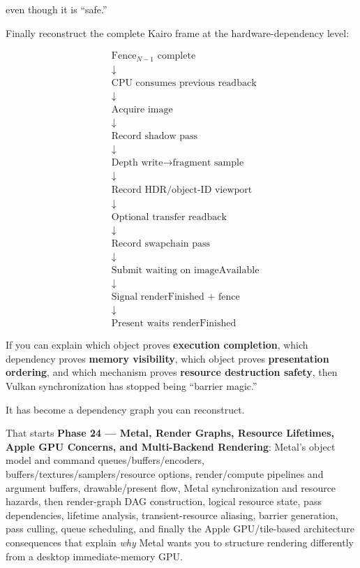 even though it is ``safe.''

Finally reconstruct the complete Kairo frame at the hardware-dependency level:

\[
\boxed{
\begin{aligned}
&\text{Fence}_{N-1}\text{ complete}\\
&\downarrow\\
&\text{CPU consumes previous readback}\\
&\downarrow\\
&\text{Acquire image}\\
&\downarrow\\
&\text{Record shadow pass}\\
&\downarrow\\
&\text{Depth write}\rightarrow\text{fragment sample}\\
&\downarrow\\
&\text{Record HDR/object-ID viewport}\\
&\downarrow\\
&\text{Optional transfer readback}\\
&\downarrow\\
&\text{Record swapchain pass}\\
&\downarrow\\
&\text{Submit waiting on imageAvailable}\\
&\downarrow\\
&\text{Signal renderFinished + fence}\\
&\downarrow\\
&\text{Present waits renderFinished}
\end{aligned}
}
\]

If you can explain which object proves \textbf{execution completion}, which dependency proves \textbf{memory visibility}, which object proves \textbf{presentation ordering}, and which mechanism proves \textbf{resource destruction safety}, then Vulkan synchronization has stopped being ``barrier magic.''

It has become a dependency graph you can reconstruct.

That starts \textbf{Phase 24 --- Metal, Render Graphs, Resource Lifetimes, Apple GPU Concerns, and Multi-Backend Rendering}: Metal's object model and command queues/buffers/encoders, buffers/textures/samplers/resource options, render/compute pipelines and argument buffers, drawable/present flow, Metal synchronization and resource hazards, then render-graph DAG construction, logical resource state, pass dependencies, lifetime analysis, transient-resource aliasing, barrier generation, pass culling, queue scheduling, and finally the Apple GPU/tile-based architecture consequences that explain \emph{why} Metal wants you to structure rendering differently from a desktop immediate-memory GPU.

